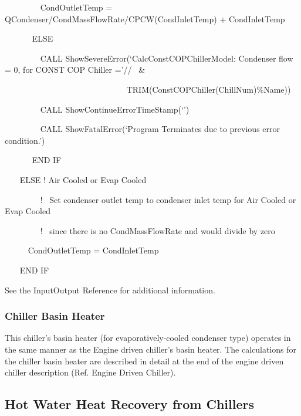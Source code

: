 ~~~~~~~~ CondOutletTemp = QCondenser/CondMassFlowRate/CPCW(CondInletTemp) + CondInletTemp

~~~~~~ ELSE

~~~~~~~~ CALL ShowSevereError(`CalcConstCOPChillerModel: Condenser flow = 0, for CONST COP Chiller ='//~ \&

~~~~~~ ~~~~~~~~~~~~~~~~~~~~~~~TRIM(ConstCOPChiller(ChillNum)\%Name))

~~~~~~~~ CALL ShowContinueErrorTimeStamp(`')

~~~~~~~~ CALL ShowFatalError(`Program Terminates due to previous error condition.')

~~~~~~ END IF

~~~ ELSE ! Air Cooled or Evap Cooled

~~~~~~~~ !~ Set condenser outlet temp to condenser inlet temp for Air Cooled or Evap Cooled

~~~~~~~~ !~ since there is no CondMassFlowRate and would divide by zero

~~~~~ CondOutletTemp = CondInletTemp

~~~ END IF

See the InputOutput Reference for additional information.

\subsubsection{Chiller Basin Heater}\label{chiller-basin-heater-1}

This chiller's basin heater (for evaporatively-cooled condenser type) operates in the same manner as the Engine driven chiller's basin heater. The calculations for the chiller basin heater are described in detail at the end of the engine driven chiller description (Ref. Engine Driven Chiller).

\subsection{Hot Water Heat Recovery from Chillers}\label{hot-water-heat-recovery-from-chillers}

